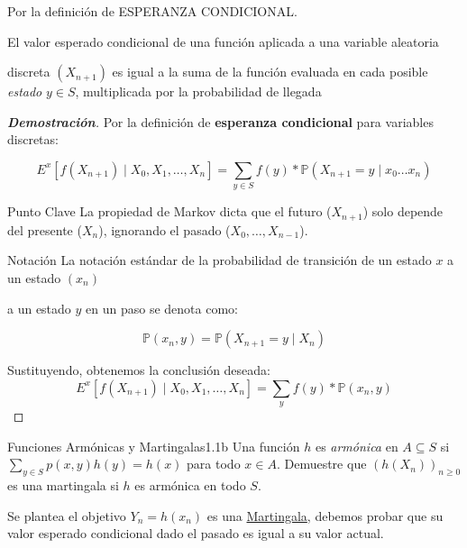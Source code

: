 \documentclass[10pt,a4paper]{article}
\begin{document}
\vspace{5mm}

    Por la definición de ESPERANZA CONDICIONAL.

    El valor esperado condicional de una función aplicada a una variable aleatoria

    discreta \( \left( X_{n+1}  \right) \) es igual a la suma de la función evaluada en cada posible \textit{estado} \( y \in S\), multiplicada por la probabilidad de llegada


\begin{proof}[\textbf{Demostración}]
    Por la definición de \textbf{esperanza condicional} para variables discretas:
    
    \[E^{x}\left[ f(X_{n+1}) \mid X_0, X_1, \ldots, X_n \right] = \sum_{y \in S} f(y) * \mathbb{P}(X_{n+1}=y \mid x_{0} \dots x_{n})  \]

    \begin{alerta}{Punto Clave}
        La propiedad de Markov dicta que el futuro ($X_{n+1}$) solo depende del presente ($X_n$), ignorando el pasado ($X_0, \dots, X_{n-1}$).
    \end{alerta}

    \begin{nota}{Notación}
        La notación estándar de la probabilidad de transición de un estado \( x \) a un estado \( \left( x_{n} \right) \)

        a un estado \(y\) en un paso  se denota como:

    \[ \boxed{\mathbb{P}\left(x_{n},y\right) } = \mathbb{P}(X_{n+1}=y \mid X_n)\]
    \end{nota}


    
    Sustituyendo, obtenemos la conclusión deseada:
   \[ E^{x}\left[ f(X_{n+1}) \mid X_0, X_1, \ldots, X_n \right] =  \sum_{y} f(y) * \mathbb{P}\left(x_{n},y\right) \]
\end{proof}

\newpage

\begin{ejercicio}{Funciones Armónicas y Martingalas}{1.1b}
    Una función $h$ es \textit{armónica} en $A \subseteq S$ si $\sum_{y \in S} p(x,y) h(y) = h(x)$ para todo $x \in A$. 
    Demuestre que $(h(X_n))_{n \geq 0}$ es una martingala si $h$ es armónica en todo $S$.
\end{ejercicio}

\vspace{2mm}

 Se plantea el objetivo $Y_{n} = h\left(x_{n}\right) $ es una \ul{Martingala}, debemos probar que su valor esperado 
 condicional dado el pasado es igual a su valor actual.
\end{document}
